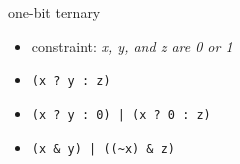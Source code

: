 \begin{frame}[fragile,label=exTernaryOneBitCombine]{one-bit ternary}
    \begin{itemize}
        \item constraint: \textit{x, y, and z are 0 or 1}
        \item \lstinline|(x ? y : z)|
        \item {\color{green!70!black}\lstinline+(x ? y : 0)+}\lstinline+ | +{\color{blue!70!black}\lstinline+(x ? 0 : z)+}
        \item {\color{green!70!black}\lstinline+(x & y)+}\lstinline+ | +{\color{blue!70!black}\lstinline+((~x) & z)+}
    \end{itemize}
\end{frame}
